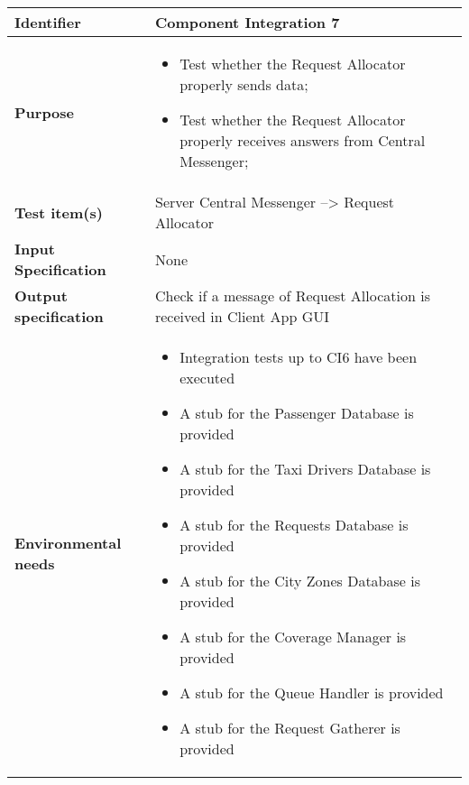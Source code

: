 \begin{center}
\begin{tabular}{lp{}}
\toprule
\textbf{Identifier}		&	Component Integration 7\\
\midrule
\textbf{Purpose}		&	\begin{itemize}
					\item Test whether the Request Allocator properly sends data;
					\item Test whether the Request Allocator properly receives answers from Central Messenger;
					\end{itemize}	\\
\textbf{Test item(s)}	&	Server Central Messenger --> Request Allocator\\
\textbf{Input Specification}	&	None\\
\textbf{Output specification}	&	Check if a message of Request Allocation is received in Client App GUI\\
\textbf{Environmental needs}	&	\begin{itemize}
							\item Integration tests up to CI6 have been executed
							\item A stub for the Passenger Database is provided
							\item A stub for the Taxi Drivers Database is provided
							\item A stub for the Requests Database is provided
							\item A stub for the City Zones Database is provided
							\item A stub for the Coverage Manager is provided
							\item A stub for the Queue Handler is provided
							\item A stub for the Request Gatherer is provided
							\end{itemize}	\\
\bottomrule
\end{tabular}
\end{center}




